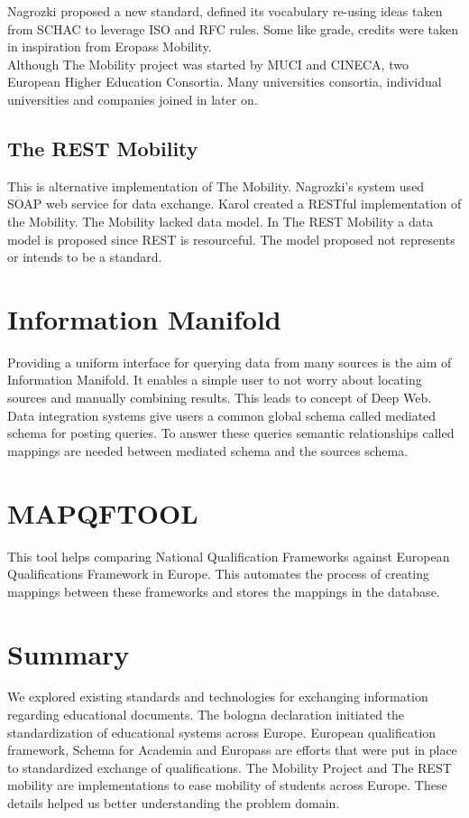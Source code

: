 \documentclass[12pt,a4paper,oneside]{book}
\begin{document}

    Nagrozki proposed a new standard, defined its vocabulary re-using ideas taken from SCHAC to leverage ISO and RFC rules. Some like grade, credits were taken in inspiration from Eropass Mobility. \\

    Although The Mobility project was started by MUCI and CINECA, two European Higher Education Consortia. Many universities consortia, individual universities and companies joined in later on. 

    \subsection{The REST Mobility}
    This is alternative implementation of The Mobility. Nagrozki's system used SOAP web service for data exchange. Karol created a RESTful implementation of the Mobility. The Mobility lacked data model. In The REST Mobility a data model is proposed since REST is resourceful. The model proposed not represents or intends to be a standard. \cite{Integration of Services in the Mobility Project}

\section{Information Manifold}
Providing a uniform interface for querying data from many sources is the aim of Information Manifold. It enables a simple user to not worry about locating sources and manually combining results. This leads to concept of Deep Web. Data integration systems give users a common global schema called mediated schema for posting queries. To answer these queries semantic relationships called mappings are needed between mediated schema and the sources schema. \cite{Data integration: the teenage years}

\section{MAPQFTOOL}
This tool helps comparing National Qualification Frameworks against European Qualifications Framework in Europe. This automates the process of creating mappings between these frameworks and stores the mappings in the database. 

\section{Summary}
We explored existing standards and technologies for exchanging information regarding educational documents. The bologna declaration initiated the standardization of educational systems across Europe. European qualification framework, Schema for Academia and Europass are efforts that were put in place to standardized exchange of qualifications. The Mobility Project and The REST mobility are implementations to ease mobility of students across Europe.  These details helped us better understanding the problem domain.
\end{document}
